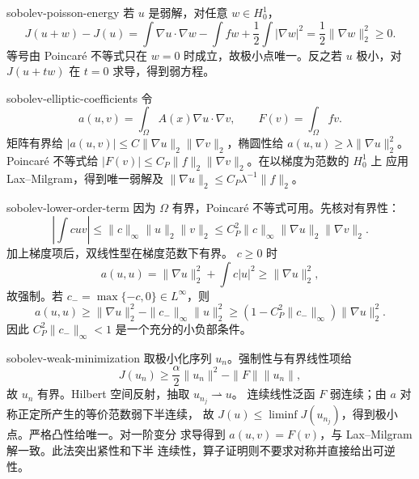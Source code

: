 \begin{solution}{sobolev-poisson-energy}
若 \(u\) 是弱解，对任意 \(w\in H_0^1\)，
\[
 J(u+w)-J(u)
 =\int\nabla u\cdot\nabla w-\int fw+\frac12\int|\nabla w|^2
 =\frac12\|\nabla w\|_2^2\ge0.
\]
等号由 Poincaré 不等式只在 \(w=0\) 时成立，故极小点唯一。反之若 \(u\)
极小，对 \(J(u+tw)\) 在 \(t=0\) 求导，得到弱方程。
\end{solution}

\begin{solution}{sobolev-elliptic-coefficients}
令
\[
 a(u,v)=\int_\Omega A(x)\nabla u\cdot\nabla v,\qquad
 F(v)=\int_\Omega fv.
\]
矩阵有界给 \(|a(u,v)|\le C\|\nabla u\|_2\|\nabla v\|_2\)，椭圆性给
\(a(u,u)\ge\lambda\|\nabla u\|_2^2\)。Poincaré 不等式给
\(|F(v)|\le C_P\|f\|_2\|\nabla v\|_2\)。在以梯度为范数的 \(H_0^1\) 上
应用 Lax--Milgram，得到唯一弱解及
\(\|\nabla u\|_2\le C_P\lambda^{-1}\|f\|_2\)。
\end{solution}

\begin{solution}{sobolev-lower-order-term}
因为 \(\Omega\) 有界，Poincaré 不等式可用。先核对有界性：
\[
 \left|\int c uv\right|
 \le\|c\|_\infty\|u\|_2\|v\|_2
 \le C_P^2\|c\|_\infty\|\nabla u\|_2\|\nabla v\|_2.
\]
加上梯度项后，双线性型在梯度范数下有界。
\(c\ge0\) 时
\[
 a(u,u)=\|\nabla u\|_2^2+\int c|u|^2\ge\|\nabla u\|_2^2,
\]
故强制。若 \(c_-= \max\{-c,0\}\in L^\infty\)，则
\[
 a(u,u)\ge\|\nabla u\|_2^2-\|c_-\|_\infty\|u\|_2^2
 \ge(1-C_P^2\|c_-\|_\infty)\|\nabla u\|_2^2.
\]
因此 \(C_P^2\|c_-\|_\infty<1\) 是一个充分的小负部条件。
\end{solution}

\begin{solution}{sobolev-weak-minimization}
取极小化序列 \(u_n\)。强制性与有界线性项给
\[
 J(u_n)\ge\frac\alpha2\|u_n\|^2-\|F\|\|u_n\|,
\]
故 \(u_n\) 有界。Hilbert 空间反射，抽取 \(u_{n_j}\rightharpoonup u\)。
连续线性泛函 \(F\) 弱连续；由 \(a\) 对称正定所产生的等价范数弱下半连续，
故 \(J(u)\le\liminf J(u_{n_j})\)，得到极小点。严格凸性给唯一。对一阶变分
求导得到 \(a(u,v)=F(v)\)，与 Lax--Milgram 解一致。此法突出紧性和下半
连续性，算子证明则不要求对称并直接给出可逆性。
\end{solution}

